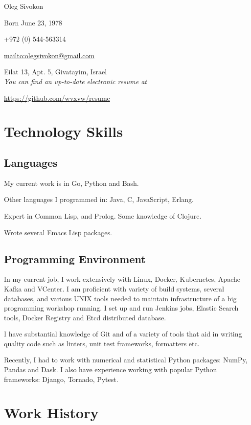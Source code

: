 \documentclass[11pt]{article}
\author{Oleg Sivokon}
\date{\textit{<2017-02-23>}}
\title{}
\begin{document}
\begin{center}
Oleg Sivokon

Born June 23, 1978

+972 (0) 544-563314

\url{mailto:olegsivokon@gmail.com}

Eilat 13, Apt. 5, Givatayim, Israel \\[18pt]

\small \emph{You can find an up-to-date electronic resume at}

\url{https://github.com/wvxvw/resume} \\[48pt]
\end{center}

\section*{Technology Skills}
\label{sec-1}
\subsection*{Languages}
\label{sec-1-1}
My current work is in Go, Python and Bash.

Other languages I programmed in: Java, C, JavaScript, Erlang.

Expert in Common Lisp, and Prolog.  Some knowledge of Clojure.

Wrote several Emacs Lisp packages.

\subsection*{Programming Environment}
\label{sec-1-2}
In my current job, I work extensively with Linux, Docker,
Kubernetes, Apache Kafka and VCenter.  I am proficient with variety
of build systems, several databases, and various UNIX tools needed
to maintain infrastructure of a big programming workshop running.
I set up and run Jenkins jobs, Elastic Search tools, Docker
Registry and Etcd distributed database.

I have substantial knowledge of Git and of a variety of tools that
aid in writing quality code such as linters, unit test frameworks,
formatters etc.

Recently, I had to work with numerical and statistical Python
packages: NumPy, Pandas and Dask.  I also have experience working
with popular Python frameworks: Django, Tornado, Pytest.

\section*{Work History}
\label{sec-2}
\end{document}
